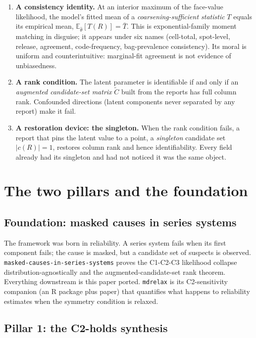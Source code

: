\documentclass[11pt]{article}
\newcommand{\E}{\mathbb{E}}
\begin{document}
\begin{enumerate}
\item \textbf{A consistency identity.} At an interior maximum of the face-value
  likelihood, the model's fitted mean of a \emph{coarsening-sufficient statistic}
  $T$ equals its empirical mean, $\E_{\hat\theta}[T(R)] = \bar T$. This is
  exponential-family moment matching in disguise; it appears under six names
  (cell-total, spot-level, release, agreement, code-frequency, bag-prevalence
  consistency). Its moral is uniform and counterintuitive: marginal-fit agreement
  is not evidence of unbiasedness.
\item \textbf{A rank condition.} The latent parameter is identifiable if and only
  if an \emph{augmented candidate-set matrix} $\tilde C$ built from the reports has
  full column rank. Confounded directions (latent components never separated by any
  report) make it fail.
\item \textbf{A restoration device: the singleton.} When the rank condition fails,
  a report that pins the latent value to a point, a \emph{singleton} candidate set
  $\lvert c(R) \rvert = 1$, restores column rank and hence identifiability. Every
  field already had its singleton and had not noticed it was the same object.
\end{enumerate}

\section{The two pillars and the foundation}

\subsection{Foundation: masked causes in series systems}

The framework was born in reliability. A series system fails when its first
component fails; the cause is masked, but a candidate set of suspects is observed.
\texttt{masked-causes-in-series-systems} proves the C1-C2-C3 likelihood collapse
distribution-agnostically and the augmented-candidate-set rank theorem. Everything
downstream is this paper ported. \texttt{mdrelax} is its C2-sensitivity companion
(an R package plus paper) that quantifies what happens to reliability estimates when
the symmetry condition is relaxed.

\subsection{Pillar 1: the C2-holds synthesis}
\end{document}
